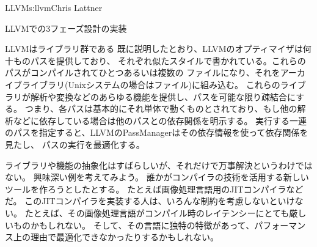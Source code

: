 \begin{aosachapter}{LLVM}{s:llvm}{Chris Lattner}
\begin{aosasect1}{LLVMでの3フェーズ設計の実装}
\begin{aosasect2}{LLVMはライブラリ群である}
既に説明したとおり、LLVMのオプティマイザは何十ものパスを提供しており、
それぞれ似たスタイルで書かれている。これらのパスがコンパイルされてひとつあるいは複数の
ファイルになり、それをアーカイブライブラリ(Unixシステムの場合はファイル)に組み込む。
これらのライブラリが解析や変換などのあらゆる機能を提供し、パスを可能な限り疎結合にする。
つまり、各パスは基本的にそれ単体で動くものとされており、もし他の解析などに依存している場合は他のパスとの依存関係を明示する。
実行する一連のパスを指定すると、LLVMのPassManagerはその依存情報を使って依存関係を見たし、
パスの実行を最適化する。

ライブラリや機能の抽象化はすばらしいが、それだけで万事解決というわけではない。
興味深い例を考えてみよう。
誰かがコンパイラの技術を活用する新しいツールを作ろうとしたとする。
たとえば画像処理言語用のJITコンパイラなどだ。
このJITコンパイラを実装する人は、いろんな制約を考慮しないといけない。
たとえば、その画像処理言語がコンパイル時のレイテンシーにとても厳しいものかもしれない。
そして、その言語に独特の特徴があって、パフォーマンス上の理由で最適化できなかったりするかもしれない。


\end{aosasect2}
\end{aosasect1}
\end{aosachapter}
